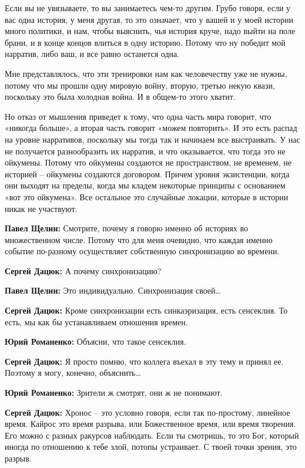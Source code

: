 Если вы не увязываете, то вы занимаетесь чем-то другим. Грубо говоря, если у
вас одна история, у меня другая, то это означает, что у вашей и у моей истории
много политики, и нам, чтобы выяснить, чья история круче, надо выйти на поле
брани, и в конце концов влиться в одну историю. Потому что ну победит мой
нарратив, либо ваш, и все равно останется одна.

Мне представлялось, что эти тренировки нам как человечеству уже не нужны,
потому что мы прошли одну мировую войну, вторую, третью некую квази, поскольку
это была холодная война. И в общем-то этого хватит.

Но отказ от мышления приведет к тому, что одна часть мира говорит, что «никогда
больше», а вторая часть говорит «можем повторить». И это есть распад на уровне
нарративов, поскольку мы тогда так и начинаем все выстраивать. У нас не
получается разнообразить их нарратив, и что оказывается, что тогда это не
ойкумены. Потому что ойкумены создаются не пространством, не временем, не
историей – ойкумены создаются договором. Причем уровня экзистенции, когда они
выходят на пределы, когда мы кладем некоторые принципы с основанием «вот это
ойкумена». Все остальное это случайные локации, которые в истории никак не
участвуют.

\textbf{Павел Щелин:} Смотрите, почему я говорю именно об историях во множественном
числе. Потому что для меня очевидно, что каждая именно событие по-разному
осуществляет собственную синхронизацию во времени.

\textbf{Сергей Дацюк:} А почему синхронизацию?

\textbf{Павел Щелин:} Это индивидуально. Синхронизация своей…

\textbf{Сергей Дацюк:} Кроме синхронизации есть синкаэризация, есть сенсеклия. То есть,
мы как бы устанавливаем отношения времен.

\textbf{Юрий Романенко:} Объясни, что такое сенсеклия.

\textbf{Сергей Дацюк:} Я просто помню, что коллега въехал в эту тему и принял ее.
Поэтому я могу, конечно, объяснить…

\textbf{Юрий Романенко:} Зрители ж смотрят, они ж не понимают.

\textbf{Сергей Дацюк:} Хронос – это условно говоря, если так по-простому, линейное
время. Кайрос это время разрыва, или Божественное время, или время творения.
Его можно с разных ракурсов наблюдать. Если ты смотришь, то это Бог, который
иногда по отношению к тебе злой, потопы устраивает. С твоей точки зрения, это
разрыв.

